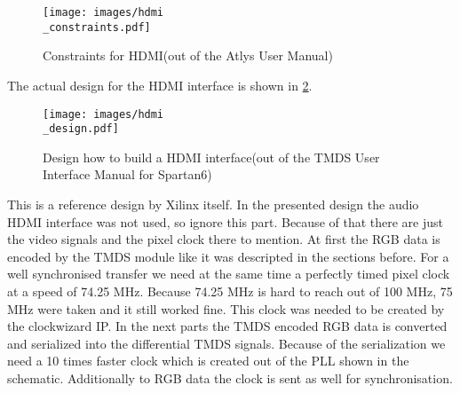 \begin{figure}[h]
	\texttt{[image: images/hdmi\\\_constraints.pdf]}

\caption{Constraints for HDMI(out of the Atlys User Manual)}
\label{hdmi\_constraints}
\end{figure}

The actual design for the HDMI interface is shown in \ref{hdmi\_design}. 
\begin{figure}[h]
	\texttt{[image: images/hdmi\\\_design.pdf]}

\caption{Design how to build a HDMI interface(out of the TMDS User Interface Manual for Spartan6)}
\label{hdmi\_design}
\end{figure}
This is a reference design by Xilinx itself. In the presented design the audio HDMI interface was not used, so ignore this part. Because of that there are just the video signals and the pixel clock there to mention. At first the RGB data is encoded by the TMDS module like it was descripted in the sections before. For a well synchronised transfer we need at the same time a perfectly timed pixel clock at a speed of 74.25 MHz. Because 74.25 MHz is hard to reach out of 100 MHz, 75 MHz were taken and it still worked fine. This clock was needed to be created by the clockwizard IP. In the next parts the TMDS encoded RGB data is converted and serialized into the differential TMDS signals. Because of the serialization we need a 10 times faster clock which is created out of the PLL shown in the schematic. Additionally to RGB data the clock is sent as well for synchronisation.




